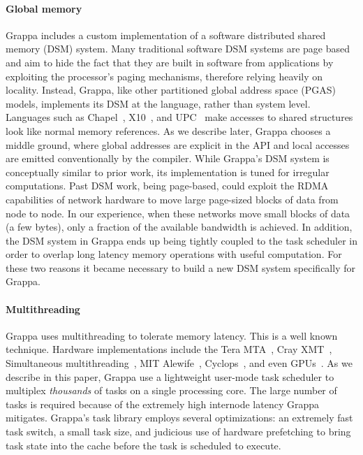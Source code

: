 \paragraph{Global memory} Grappa includes a custom implementation of a software distributed shared memory (DSM) system. Many traditional software DSM systems are page based~\cite{Treadmarks,munin} and aim to hide the fact that they are built in software from applications by exploiting the processor's paging mechanisms, therefore relying heavily on locality. Instead, Grappa, like other partitioned global address space (PGAS) models, implements its DSM at the language, rather than system level.
Languages such as Chapel~\cite{Chamberlain:2007}, X10~\cite{X10:2005}, and UPC~\cite{upc:2005} make accesses to shared structures look like normal memory references. As we describe later, Grappa chooses a middle ground, where global addresses are explicit in the API and local accesses are emitted conventionally by the compiler.  While Grappa's DSM system is conceptually similar to prior work, its implementation is tuned for irregular computations.  Past DSM work, being page-based, could exploit the RDMA capabilities of network hardware to move large page-sized blocks of data from node to node. In our experience, when these networks move small blocks of data (a few bytes), only a fraction of the available bandwidth is achieved.
In addition, the DSM system in Grappa ends up being tightly coupled to the task scheduler in order to overlap long latency memory operations with useful computation.  For these two reasons it became necessary to build a new DSM system specifically for Grappa.

\paragraph{Multithreading} Grappa uses multithreading to tolerate memory latency. This is a well known technique. Hardware implementations include the Tera MTA~\cite{tera:mta1}, Cray XMT~\cite{feo:xmt}, Simultaneous multithreading~\cite{tullsen:smt}, MIT Alewife~\cite{agarwal:alewife}, Cyclops~\cite{almasi:cyclops}, and even GPUs~\cite{gpus}. As we describe in this paper, Grappa use a lightweight user-mode task scheduler to multiplex \emph{thousands\/} of tasks on a single processing core. The large number of tasks is required because of the extremely high internode latency Grappa mitigates.  Grappa's task library employs several optimizations: an extremely fast task switch, a small task size, and judicious use of hardware prefetching to bring task state into the cache before the task is scheduled to execute.


